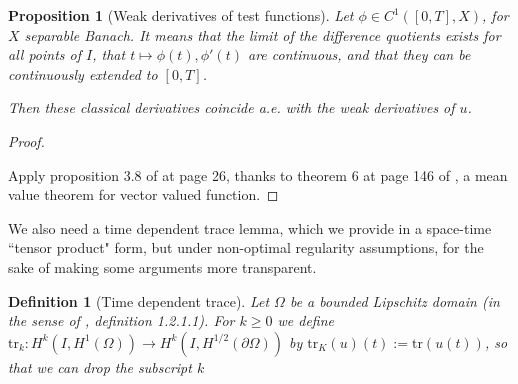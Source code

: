 \documentclass[english,a4paper,9pt,oneside]{scrbook}	%
\theoremstyle{break}
\newtheorem{defn}[equation]{Definition}
\newtheorem{prop}[equation]{Proposition}
\newenvironment{mproof}[1][\proofname]{%
  \begin{proof}[#1]$ $\par\nobreak\ignorespaces
}{%
  \end{proof}
}
\renewcommand*{\proofname}{Proof}
\theoremstyle{remark}
\newcommand{\tr}{\text{tr}}
\newcommand{\emb}{\hookrightarrow}
\begin{document}
\begin{appendices}
%
%
%


\begin{prop}[Weak derivatives of test functions]
\label{prop:weak_class}
Let $\phi \in C^1([0,T],X)$, for $X$ separable Banach. It means that the limit of the difference quotients exists for all points of $I$, that $t\mapsto \phi(t), \phi'(t)$ are continuous, and that they can be continuously extended to $[0,T]$.

Then these classical derivatives coincide a.e. with the weak derivatives of $u$.

\end{prop}
\begin{mproof}


Apply proposition 3.8 of \cite{kreuter} at page 26, thanks to theorem 6 at page 146 of \cite{mvt}, a mean value theorem for vector valued function.
\end{mproof}

We also need a time dependent trace lemma, which we provide in a space-time ``tensor product" form, but under non-optimal regularity assumptions, for the sake of making some arguments more transparent.

\begin{defn}[Time dependent trace]
Let $\Omega$ be a bounded Lipschitz domain (in the sense of \cite{grisvard}, definition 1.2.1.1). For $k\geq 0$ we define $\tr_k: H^k(I,H^1(\Omega))\rightarrow H^k(I, H^{1/2} (\partial \Omega))$ by $\tr_K(u)(t):=\tr(u(t))$, so that we can drop the subscript $k$
\end{defn}



\end{appendices}
\end{document}
